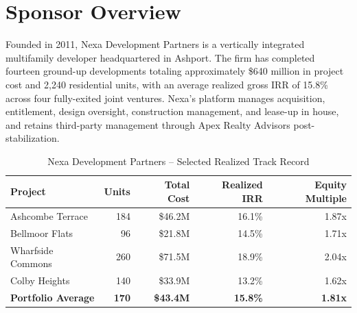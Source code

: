 \section{Sponsor Overview}
Founded in 2011, Nexa Development Partners is a vertically integrated multifamily developer
headquartered in Ashport. The firm has completed fourteen ground-up developments totaling
approximately \$640 million in project cost and 2,240 residential units, with an average
realized gross IRR of 15.8\% across four fully-exited joint ventures. Nexa's platform manages
acquisition, entitlement, design oversight, construction management, and lease-up in house, and
retains third-party management through Apex Realty Advisors post-stabilization.

\begin{table}[H]
\centering
\caption{Nexa Development Partners -- Selected Realized Track Record}
\label{tab:trackrecord}
\vspace{4pt}
\begin{tabularx}{\linewidth}{X r r r r}
\toprule
\rowcolor{jvnavy}
\textbf{\color{white}Project} & \textbf{\color{white}Units} & \textbf{\color{white}Total Cost} & \textbf{\color{white}Realized IRR} & \textbf{\color{white}Equity Multiple} \\
\midrule
Ashcombe Terrace & 184 & \$46.2M & 16.1\% & 1.87x \\
\rowcolor{jvcream}
Bellmoor Flats & 96 & \$21.8M & 14.5\% & 1.71x \\
Wharfside Commons & 260 & \$71.5M & 18.9\% & 2.04x \\
\rowcolor{jvcream}
Colby Heights & 140 & \$33.9M & 13.2\% & 1.62x \\
\midrule
\textbf{Portfolio Average} & \textbf{170} & \textbf{\$43.4M} & \textbf{15.8\%} & \textbf{1.81x} \\
\bottomrule
\end{tabularx}
\end{table}

